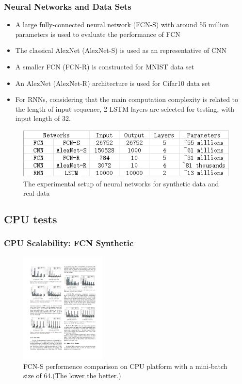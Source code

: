 
\begin{frame}
  \MyLogo
  \frametitle{Neural Networks and Data Sets}  

\medskip

\begin{itemize}

\item A large fully-connected neural network (\alert{FCN-S}) with around 55 million parameters is used to evaluate the performance of FCN

\item The classical AlexNet (\alert{AlexNet-S}) is used as an representative of CNN

\item A smaller FCN (\alert{FCN-R}) is constructed for MNIST data set

\item An AlexNet (\alert{AlexNet-R}) architecture is used for Cifar10 data set

\item For RNNs, considering that the main computation complexity is related to the length of input sequence, 2 LSTM layers are selected for testing, with input length of 32.

\end{itemize}

\begin{figure}[htbp] 
\includegraphics[height=1in]{figures/models.png} 
\caption{The experimental setup of neural networks for synthetic data and real data}
\end{figure}
	
\end{frame}

\subsection{CPU tests}

\begin{frame}
	\MyLogo
	\frametitle{CPU Scalability: FCN Synthetic}  
	\begin{figure}[htbp] 
		\includegraphics[height=2.2in]{figures/FCN-S1.pdf} 
		\caption{FCN-S performence comparison on CPU platform with a mini-batch size of 64.(The lower the better.)}
	\end{figure}
\end{frame}

